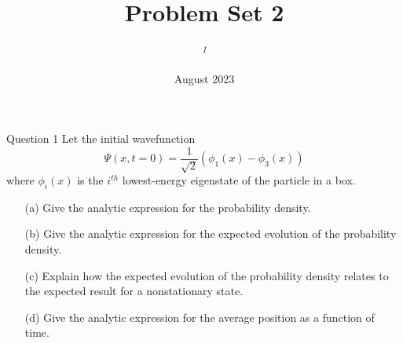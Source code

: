 \documentclass{article}
\title{\LARGE {\fontfamily{qhv}\selectfont \textcolor{MSBlue}{Problem Set 2}}}
\author{
\small{\textit{\textsuperscript{1}}}}
\date{August 2023}
\makeatletter
\renewcommand{\maketitle}{\bgroup\setlength{\parindent}{0pt}
\begin{flushleft}
  \textbf{\@title}

  \@author
\end{flushleft}\egroup
}
\makeatother
\begin{document}
\maketitle

\begin{mybox}{Question 1}
Let the initial wavefunction
\[
\Psi(x, t = 0) = \frac{1}{\sqrt{2}}(\phi_1(x) - \phi_3(x))
\]
where $\phi_i(x)$ is the $i^{th}$ lowest-energy eigenstate of the particle in a box.
\begin{itemize}
    \item[(a)] Give the analytic expression for the probability density.
    \item[(b)] Give the analytic expression for the expected evolution of the probability density.
    \item[(c)] Explain how the expected evolution of the probability density relates to the expected result for a nonstationary state.
    \item[(d)] Give the analytic expression for the average position as a function of time.
\end{itemize}
\end{mybox}
\end{document}
